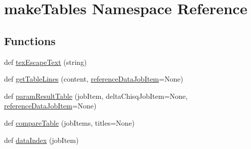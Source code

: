 \hypertarget{namespacemakeTables}{}\section{make\+Tables Namespace Reference}
\label{namespacemakeTables}
\subsection*{Functions}
\begin{DoxyCompactItemize}
\item 
def \mbox{\hyperlink{namespacemakeTables_abbf7a84c8c93f8d3f0e1b93072989766}{tex\+Escape\+Text}} (string)
\item 
def \mbox{\hyperlink{namespacemakeTables_a2969b9894fd7dee3f707de33c3c6d3ca}{get\+Table\+Lines}} (content, \mbox{\hyperlink{namespacemakeTables_ad2d53b08380c10346fc6ff9a0e12942b}{reference\+Data\+Job\+Item}}=None)
\item 
def \mbox{\hyperlink{namespacemakeTables_a05676f114347275725afdc58dc3656ff}{param\+Result\+Table}} (job\+Item, delta\+Chisq\+Job\+Item=None, \mbox{\hyperlink{namespacemakeTables_ad2d53b08380c10346fc6ff9a0e12942b}{reference\+Data\+Job\+Item}}=None)
\item 
def \mbox{\hyperlink{namespacemakeTables_a97f7aac98d97fef173d6ba74a446ec4b}{compare\+Table}} (job\+Items, titles=None)
\item 
def \mbox{\hyperlink{namespacemakeTables_a517bb45e1e7d60d121454c28f132a5bc}{data\+Index}} (job\+Item)
\end{DoxyCompactItemize}
